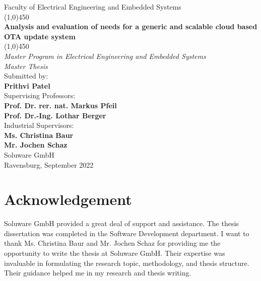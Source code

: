 \documentclass[12pt,a4paper]{article}
\begin{document}
\begin{titlepage}
\begin{center}
\setcounter{page}{1}

\thispagestyle{a}
\vspace*{2cm}
\large{Faculty of Electrical Engineering and Embedded Systems} \\[4mm]

\line(1,0){450}\\
\Large{\textbf{Analysis and evaluation of needs for a generic and scalable cloud based OTA update system}}\\
\line(1,0){450}\\ [4mm]

\large{\textit{Master Program in Electrical Engineering and Embedded Systems}}\\[6mm] \Large{\textit{Master Thesis}}\\[6mm]

\large{Submitted by:} \\ [4mm]
\large{\textbf{Prithvi Patel}} \\ [1.5cm]

\large{Supervising Professors:} \\ [4mm]
\large{\textbf{Prof. Dr. rer. nat. Markus Pfeil}} \\ [4mm]
\large{\textbf{Prof. Dr.-Ing. Lothar Berger}} \\ [1.5cm]

\large{Industrial Supervisors:} \\ [4mm]
\large{\textbf{Ms. Christina Baur}} \\ [4mm]
\large{\textbf{Mr. Jochen Schaz}} \\ [4mm]
\large{Soluware GmbH} \\ [1.5cm]

\large{Ravensburg, September 2022} \\ [4mm]

\end{center}
\end{titlepage}

\newpage
\pagestyle{fancy}
\fancyfoot{}
\fancyhead{}

\setlength{\footskip=0pt}
\setlength{\headheight=35pt}

\newpage
\section*{Acknowledgement}

Soluware GmbH provided a great deal of support and assistance. The thesis dissertation was completed in the Software Development department. I want to thank Ms. Christina Baur and Mr. Jochen Schaz for providing me the opportunity to write the thesis at Soluware GmbH. Their expertise was invaluable in formulating the research topic, methodology, and thesis structure. Their guidance helped me in my research and thesis writing. \\
\end{document}
